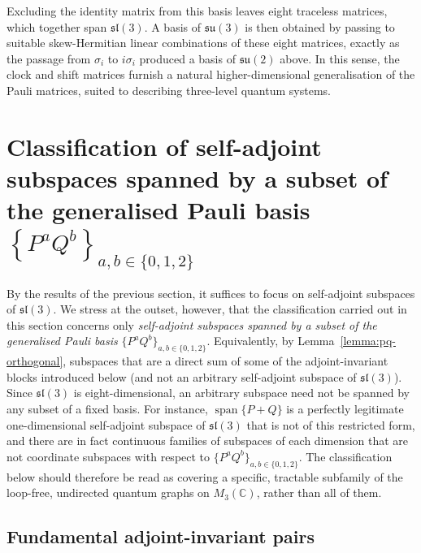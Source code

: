 Excluding the identity matrix from this basis leaves eight traceless
matrices, which together span \( \mathfrak{sl}(3) \). A basis
of \( \mathfrak{su}(3) \) is then obtained by passing to suitable
skew-Hermitian linear combinations of these eight matrices, exactly as
the passage from \( \sigma_i \) to \( i\sigma_i \) produced a basis of
\( \mathfrak{su}(2) \) above. In this sense, the clock and shift matrices
furnish a natural higher-dimensional generalisation of the Pauli
matrices, suited to describing three-level quantum systems.

\section{Classification of self-adjoint subspaces spanned by a
    subset of the generalised Pauli basis \( \left\{ P^{a} Q^{b}
\right\}_{a,b \in \{ 0,1,2 \}} \)}
\label{sec:classification-self-adjoint-subspaces}

By the results of the previous section, it suffices to focus on
self-adjoint subspaces of \( \mathfrak{sl}(3) \). We stress at the
outset, however, that the classification carried out in this section
concerns only \emph{self-adjoint subspaces spanned by a subset of
the generalised Pauli basis} \( \{P^aQ^b\}_{a,b \in \{0,1,2\}} \).
Equivalently, by
Lemma~\ref{lemma:pq-orthogonal}, subspaces that are a direct sum of
some of the adjoint-invariant blocks introduced below (and not
an arbitrary self-adjoint subspace of \( \mathfrak{sl}(3) \)). Since
\( \mathfrak{sl}(3) \) is eight-dimensional, an arbitrary subspace need
not be spanned by any subset of a fixed basis.\newpage
For instance, \( \operatorname{span}\{P+Q\} \) is a perfectly
legitimate one-dimensional self-adjoint subspace of \(
\mathfrak{sl}(3) \) that is
not of this restricted form, and there are in fact continuous families
of subspaces of each dimension that are not coordinate subspaces with
respect to \( \{P^aQ^b\}_{a,b \in \{0,1,2\}} \). The classification
below should therefore
be read as covering a specific, tractable subfamily of the loop-free,
undirected quantum graphs on \( M_{3}(\mathbb{C}) \), rather than all of them.

\subsection{Fundamental adjoint-invariant pairs}
\label{subsec:fundamental-adjoint-invariant-pairs}

